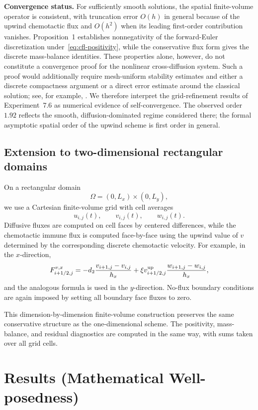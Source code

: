 \documentclass[a4paper,fleqn,longmktitle]{cas-sc}
\theoremstyle{plain}
\theoremstyle{definition}
\numberwithin{equation}{section}
\begin{document}
\medskip\noindent\textbf{Convergence status.}
For sufficiently smooth solutions, the spatial finite-volume operator is
consistent, with truncation error \(O(h)\) in general because of the upwind
chemotactic flux and \(O(h^2)\) when its leading first-order contribution
vanishes. Proposition~1 establishes nonnegativity of the forward-Euler
discretization under~\eqref{eq:cfl-positivity}, while the conservative flux form gives the
discrete mass-balance identities. These properties alone, however, do not
constitute a convergence proof for the nonlinear cross-diffusion system.
Such a proof would additionally require mesh-uniform stability estimates and
either a discrete compactness argument or a direct error estimate around the
classical solution; see, for example,
\cite{eymard2000finite,filbet2006finite,liu2026ftu}. We therefore interpret the
grid-refinement results of Experiment~7.6 as numerical evidence of
self-convergence. The observed order \(1.92\) reflects the smooth,
diffusion-dominated regime considered there; the formal asymptotic spatial
order of the upwind scheme is first order in general.

\subsection{Extension to two-dimensional rectangular domains}
\label{subsec:two-dimensional-extension}

On a rectangular domain
\[
\Omega=(0,L_x)\times(0,L_y),
\]
we use a Cartesian finite-volume grid with cell averages
\[
u_{i,j}(t),\qquad v_{i,j}(t),\qquad w_{i,j}(t).
\]
Diffusive fluxes are computed on cell faces by centered differences, while the
chemotactic immune flux is computed face-by-face using the upwind value of
\(v\) determined by the corresponding discrete chemotactic velocity. For
example, in the \(x\)-direction,
\[
F^{v,x}_{i+1/2,j}
=
-d_2\frac{v_{i+1,j}-v_{i,j}}{h_x}
+
\xi v^{\rm up}_{i+1/2,j}
\frac{w_{i+1,j}-w_{i,j}}{h_x},
\]
and the analogous formula is used in the \(y\)-direction. No-flux boundary
conditions are again imposed by setting all boundary face fluxes to zero.

This dimension-by-dimension finite-volume construction preserves the same
conservative structure as the one-dimensional scheme. The positivity,
mass-balance, and residual diagnostics are computed in the same way, with sums
taken over all grid cells.

\section{Results (Mathematical Well-posedness)}\label{sec:mathematical-analysis}
\end{document}
